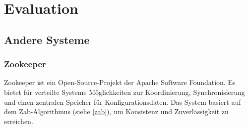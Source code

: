 \chapter{Evaluation}
\label{eval}

\section{Andere Systeme}

\subsection{Zookeeper}

Zookeeper \cite{zookeeper} ist ein Open-Source-Projekt der Apache Software Foundation. Es bietet für verteilte Systeme Möglichkeiten zur Koordinierung, Synchronisierung und einen zentralen Speicher für Konfigurationsdaten. Das System basiert auf dem Zab-Algorithmus (siehe \ref{zab}), um Konsistenz und Zuverlässigkeit zu erreichen.

